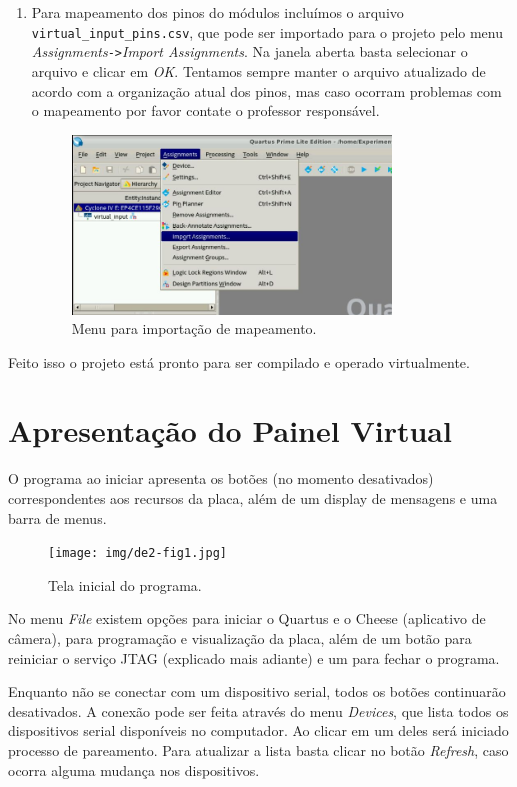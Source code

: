 \documentclass[12pt]{article}
\begin{document}
\begin{enumerate}[font=\bfseries]
    \item Para mapeamento dos pinos do módulos incluímos o arquivo \verb|virtual_input_pins.csv|, que pode ser importado para o projeto pelo menu \textit{Assignments}\verb|->|\textit{Import Assignments}. Na janela aberta basta selecionar o arquivo e clicar em \textit{OK}. Tentamos sempre manter o arquivo atualizado de acordo com a organização atual dos pinos, mas caso ocorram problemas com o mapeamento por favor contate o professor responsável.
    
    \begin{figure}[H]
    \centering
    \includegraphics[width=0.8\textwidth]{img/pins-quartus.jpg}
    \caption{\label{ref:pins-quartus}Menu para importação de mapeamento.}
    \end{figure}
    
\end{enumerate}
Feito isso o projeto está pronto para ser compilado e operado virtualmente.

\section{Apresentação do Painel Virtual}
O programa ao iniciar apresenta os botões (no momento desativados) correspondentes aos recursos da placa, além de um display de mensagens e uma barra de menus.

\begin{figure}[H]
\centering
\texttt{[image: img/de2-fig1.jpg]}
\caption{\label{ref:fig1}Tela inicial do programa.}
\end{figure}

No menu \textit{File} existem opções para iniciar o Quartus e o Cheese (aplicativo de câmera), para programação e visualização da placa, além de um botão para reiniciar o serviço JTAG (explicado mais adiante) e um para fechar o programa.

Enquanto não se conectar com um dispositivo serial, todos os botões continuarão desativados.
A conexão pode ser feita através do menu \textit{Devices}, que lista todos os dispositivos serial disponíveis no computador.
Ao clicar em um deles será iniciado processo de pareamento.
Para atualizar a lista basta clicar no botão \textit{Refresh}, caso ocorra alguma mudança nos dispositivos.
\end{document}
